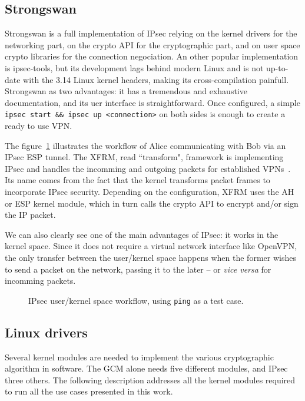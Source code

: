 

\subsection{Strongswan}
Strongswan is a full implementation of IPsec relying on the kernel drivers for the networking part, on the crypto API for the cryptographic part, and on user space crypto libraries for the connection negociation.
An other popular implementation is ipsec-tools, but its development lags behind modern Linux and is not up-to-date with the 3.14 Linux kernel headers, making its cross-compilation painfull.
Strongswan as two advantages: it has a tremendous and exhaustive documentation, and its uer interface is straightforward.
Once configured, a simple \texttt{ipsec start \&\& ipsec up <connection>} on both sides is enough to create a ready to use VPN.

The figure~\ref{fig:ipsec-workflow} illustrates the workflow of Alice communicating with Bob via an IPsec ESP tunnel.
The XFRM, read ``transform", framework is implementing IPsec and handles the incomming and outgoing packets for established VPNs~\cite{rosen2014}.
Its name comes from the fact that the kernel transforms packet frames to incorporate IPsec security.
Depending on the configuration, XFRM uses the AH or ESP kernel module, which in turn calls the crypto API to encrypt and/or sign the IP packet.

We can also clearly see one of the main advantages of IPsec: it works in the kernel space.
Since it does not require a virtual network interface like OpenVPN, the only transfer between the user/kernel space happens when the former wishes to send a packet on the network, passing it to the later -- or \textit{vice versa} for incomming packets.

\begin{figure}[ht]
\Large
\resizebox{\linewidth}{!}{%

}
\caption{IPsec user/kernel space workflow, using \texttt{ping} as a test case.}{}
\label{fig:ipsec-workflow}
\end{figure}


\subsection{Linux drivers}
Several kernel modules are needed to implement the various cryptographic algorithm in software.
The GCM alone needs five different modules, and IPsec three others.
The following description addresses all the kernel modules required to run all the use cases presented in this work.


